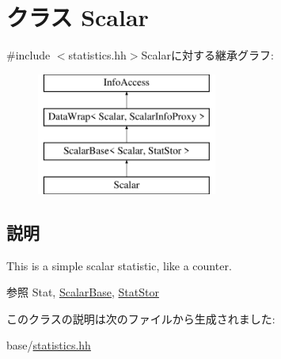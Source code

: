 \hypertarget{classStats_1_1Scalar}{
\section{クラス Scalar}
\label{classStats_1_1Scalar}
}


{\ttfamily \#include $<$statistics.hh$>$}Scalarに対する継承グラフ:\begin{figure}[H]
\begin{center}
\leavevmode
\includegraphics[height=4cm]{classStats_1_1Scalar}
\end{center}
\end{figure}


\subsection{説明}
This is a simple scalar statistic, like a counter. \begin{DoxySeeAlso}{参照}
Stat, \hyperlink{classStats_1_1ScalarBase}{ScalarBase}, \hyperlink{classStats_1_1StatStor}{StatStor} 
\end{DoxySeeAlso}


このクラスの説明は次のファイルから生成されました:\begin{DoxyCompactItemize}
\item 
base/\hyperlink{statistics_8hh}{statistics.hh}\end{DoxyCompactItemize}
